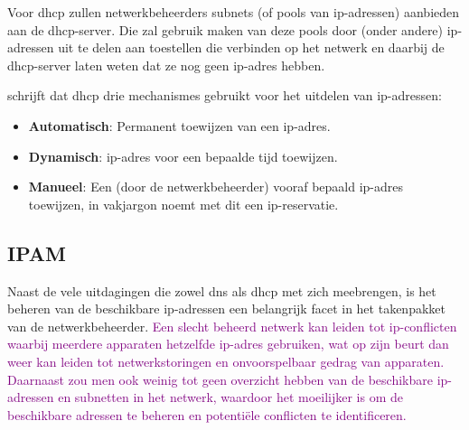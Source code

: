 {Voor \acrshort{dhcp} zullen netwerkbeheerders subnets (of pools van \acrshort{ip}-adressen) aanbieden aan de \acrshort{dhcp}-server. Die zal gebruik maken van deze pools door (onder andere) \acrshort{ip}-adressen uit te delen aan toestellen die verbinden op het netwerk en daarbij de \acrshort{dhcp}-server laten weten dat ze nog geen \acrshort{ip}-adres hebben.

\textcite{Droms1997} schrijft dat \acrshort{dhcp} drie mechanismes gebruikt voor het uitdelen van \acrshort{ip}-adressen:
\begin{itemize}
    \item \textbf{Automatisch}: Permanent toewijzen van een \acrshort{ip}-adres.
    \item \textbf{Dynamisch}: \acrshort{ip}-adres voor een bepaalde tijd toewijzen.
    \item \textbf{Manueel}: Een (door de netwerkbeheerder) vooraf bepaald \acrshort{ip}-adres toewijzen, in vakjargon noemt met dit een \acrshort{ip}-reservatie.
\end{itemize}

\subsection{IPAM}
Naast de vele uitdagingen die zowel \acrshort{dns} als \acrshort{dhcp} met zich meebrengen, is het beheren van de beschikbare \acrshort{ip}-adressen een belangrijk facet in het takenpakket van de netwerkbeheerder. \textcolor{purple}{Een slecht beheerd netwerk kan leiden tot \acrshort{ip}-conflicten waarbij meerdere apparaten hetzelfde \acrshort{ip}-adres gebruiken, wat op zijn beurt dan weer kan leiden tot netwerkstoringen en onvoorspelbaar gedrag van apparaten. Daarnaast zou men ook weinig tot geen overzicht hebben van de beschikbare \acrshort{ip}-adressen en subnetten in het netwerk, waardoor het moeilijker is om de beschikbare adressen te beheren en potentiële conflicten te identificeren.}

}
